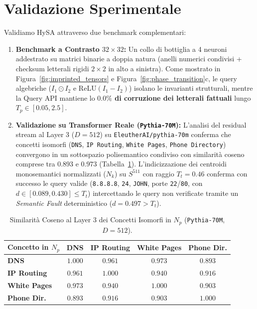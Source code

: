 \documentclass[10pt,twocolumn]{article}
\theoremstyle{definition}
\begin{document}
\section{Validazione Sperimentale}
Validiamo HySA attraverso due benchmark complementari:
\begin{enumerate}[leftmargin=*, itemsep=1.5pt, topsep=2pt]
    \item \textbf{Benchmark a Contrasto $32 \times 32$:} Un collo di bottiglia a 4 neuroni addestrato su matrici binarie a doppia natura (anelli numerici condivisi + checksum letterali rigidi $2\times2$ in alto a sinistra). Come mostrato in Figura~\ref{fig:imprinted_tensors} e Figura~\ref{fig:phase_transition}c, le query algebriche ($I_1 \odot I_2$ e $\mathrm{ReLU}(I_1 - I_2)$) isolano le invarianti strutturali, mentre la Query API mantiene lo \textbf{$0.0\%$ di corruzione dei letterali fattuali} lungo $T_p \in [0.05, 2.5]$.
    \item \textbf{Validazione su Transformer Reale (\texttt{Pythia-70M}):} L'analisi del residual stream al Layer 3 ($D=512$) su \texttt{EleutherAI/pythia-70m} conferma che concetti isomorfi (\texttt{DNS}, \texttt{IP Routing}, \texttt{White Pages}, \texttt{Phone Directory}) convergono in un sottospazio polisemantico condiviso con similarità coseno comprese tra $\mathbf{0.893}$ e $\mathbf{0.973}$ (Tabella~\ref{tab:pythia}). L'indicizzazione dei centroidi monosemantici normalizzati ($N_k$) su $S^{511}$ con raggio $T_t = 0.46$ conferma con successo le query valide (\texttt{8.8.8.8}, \texttt{24}, \texttt{JOHN}, porte \texttt{22}/\texttt{80}, con $d \in [0.089, 0.430] \le T_t$) intercettando le query non verificate tramite un \textit{Semantic Fault} deterministico ($d = 0.497 > T_t$).
\end{enumerate}

\begin{table}[h]
\centering
\caption{Similarità Coseno al Layer 3 dei Concetti Isomorfi in $N_p$ (\texttt{Pythia-70M}, $D=512$).}
\label{tab:pythia}
\vspace{0.1cm}
\scriptsize
\begin{tabular}{@{}lcccc@{}}
\toprule
\textbf{Concetto in $N_p$} & \textbf{DNS} & \textbf{IP Routing} & \textbf{White Pages} & \textbf{Phone Dir.} \\ \midrule
\textbf{DNS} & $1.000$ & $0.961$ & $0.973$ & $0.893$ \\
\textbf{IP Routing} & $0.961$ & $1.000$ & $0.940$ & $0.916$ \\
\textbf{White Pages} & $0.973$ & $0.940$ & $1.000$ & $0.903$ \\
\textbf{Phone Dir.} & $0.893$ & $0.916$ & $0.903$ & $1.000$ \\ \bottomrule
\end{tabular}
\end{table}
\end{document}

